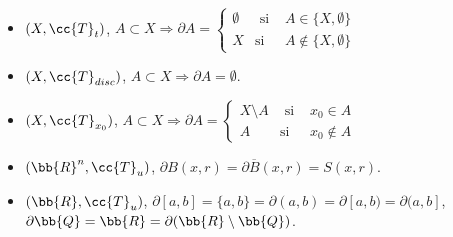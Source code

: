 \begin{ejemplo}\
    \begin{itemize}
        \item $(X, \cc{T}_t)$, $A\subset X \Rightarrow \partial A = \left\{
        \begin{array}{ccc}
            \emptyset & \text{ si } & A \in \{X, \emptyset\}\\
            X & \text{si} & A\notin \{X, \emptyset\}
        \end{array}
        \right.$
        \item $(X, \cc{T}_{disc})$, $A\subset X \Rightarrow \partial A = \emptyset$.
        \item $(X, \cc{T}_{x_0})$, $A\subset X \Rightarrow \partial A = \left\{
        \begin{array}{ccc}
            X\setminus A & \text{ si } & x_0\in A\\
            A & \text{si} & x_0 \notin A
        \end{array}
        \right.$
        \item $(\bb{R}^n, \cc{T}_u)$, $\partial B(x, r) = \partial \overline{B}(x,r) = S(x,r)$.
        \item $(\bb{R}, \cc{T}_u)$, $\partial [a,b] = \{a,b\} = \partial (a,b) = \partial [a,b) = \partial (a,b]$, $\partial \bb{Q} = \bb{R} = \partial(\bb{R}\setminus \bb{Q})$.
    \end{itemize}
\end{ejemplo}
